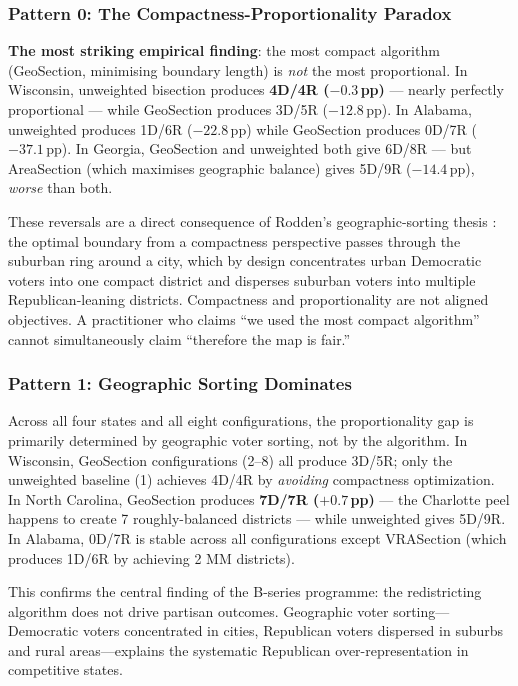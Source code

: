 \subsubsection*{Pattern 0: The Compactness-Proportionality Paradox}

\textbf{The most striking empirical finding}: the most compact algorithm (GeoSection,
minimising boundary length) is \emph{not} the most proportional.
In Wisconsin, unweighted bisection produces \textbf{4D/4R ($-0.3$\,pp)} — nearly
perfectly proportional — while GeoSection produces 3D/5R ($-12.8$\,pp).
In Alabama, unweighted produces 1D/6R ($-22.8$\,pp) while GeoSection produces
0D/7R ($-37.1$\,pp).
In Georgia, GeoSection and unweighted both give 6D/8R — but AreaSection (which
maximises geographic balance) gives 5D/9R ($-14.4$\,pp), \emph{worse} than both.

These reversals are a direct consequence of Rodden's geographic-sorting thesis
\citep{rodden2019}: the optimal boundary from a compactness perspective passes
through the suburban ring around a city, which by design concentrates urban
Democratic voters into one compact district and disperses suburban voters into
multiple Republican-leaning districts.
Compactness and proportionality are not aligned objectives.
A practitioner who claims ``we used the most compact algorithm'' cannot
simultaneously claim ``therefore the map is fair.''

\subsubsection*{Pattern 1: Geographic Sorting Dominates}

Across all four states and all eight configurations, the proportionality gap
is primarily determined by geographic voter sorting, not by the algorithm.
In Wisconsin, GeoSection configurations (2--8) all produce 3D/5R; only the
unweighted baseline (1) achieves 4D/4R by \emph{avoiding} compactness optimization.
In North Carolina, GeoSection produces \textbf{7D/7R ($+0.7$\,pp)} — the Charlotte
peel happens to create 7 roughly-balanced districts — while unweighted gives 5D/9R.
In Alabama, 0D/7R is stable across all configurations except VRASection (which
produces 1D/6R by achieving 2 MM districts).

This confirms the central finding of the B-series programme: the redistricting
algorithm does not drive partisan outcomes.
Geographic voter sorting---Democratic voters concentrated in cities,
Republican voters dispersed in suburbs and rural areas---explains the systematic
Republican over-representation in competitive states.

